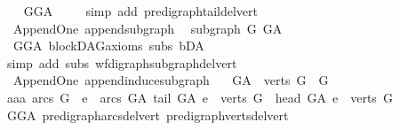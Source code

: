\begin{isabellebody}
%
\isadelimproof
\ \ %
\endisadelimproof
%
\isatagproof
{}\isamarkupfalse%
\ GG{\isacharunderscore}{\kern0pt}A\ \isanewline
\ \ \isamarkupfalse%
\ {\isacharparenleft}{\kern0pt}simp\ add{\isacharcolon}{\kern0pt}\ pre{\isacharunderscore}{\kern0pt}digraph{\isachardot}{\kern0pt}tail{\isacharunderscore}{\kern0pt}del{\isacharunderscore}{\kern0pt}vert{\isacharparenright}{\kern0pt}%
\endisatagproof
{\isafoldproof}%
%
\isadelimproof
\ \isanewline
%
\endisadelimproof
\isanewline
{}\isamarkupfalse%
\ {\isacharparenleft}{\kern0pt}\ Append{\isacharunderscore}{\kern0pt}One{\isacharparenright}{\kern0pt}\ append{\isacharunderscore}{\kern0pt}subgraph{\isacharcolon}{\kern0pt}\ \isanewline
\ {\isachardoublequoteopen}subgraph\ G\ G{\isacharunderscore}{\kern0pt}A\ {\isachardoublequoteclose}\ \isanewline
%
\isadelimproof
\ \ %
\endisadelimproof
%
\isatagproof
{}\isamarkupfalse%
\ \ GG{\isacharunderscore}{\kern0pt}A\ blockDAG{\isacharunderscore}{\kern0pt}axioms\ subs\ bD{\isacharunderscore}{\kern0pt}A\isanewline
\ \ \isamarkupfalse%
\ {\isacharparenleft}{\kern0pt}simp\ add{\isacharcolon}{\kern0pt}\ subs\ wf{\isacharunderscore}{\kern0pt}digraph{\isachardot}{\kern0pt}subgraph{\isacharunderscore}{\kern0pt}del{\isacharunderscore}{\kern0pt}vert{\isacharparenright}{\kern0pt}%
\endisatagproof
{\isafoldproof}%
%
\isadelimproof
\ \isanewline
%
\endisadelimproof
\isanewline
\isanewline
{}\isamarkupfalse%
\ {\isacharparenleft}{\kern0pt}\ Append{\isacharunderscore}{\kern0pt}One{\isacharparenright}{\kern0pt}\ append{\isacharunderscore}{\kern0pt}induce{\isacharunderscore}{\kern0pt}subgraph{\isacharcolon}{\kern0pt}\ \isanewline
\ \ {\isachardoublequoteopen}G{\isacharunderscore}{\kern0pt}A\ {\isasymrestriction}\ {\isacharparenleft}{\kern0pt}verts\ G{\isacharparenright}{\kern0pt}\ {\isacharequal}{\kern0pt}\ G{\isachardoublequoteclose}\ \ \isanewline
%
\isadelimproof
%
\endisadelimproof
%
\isatagproof
{}\isamarkupfalse%
\ {\isacharminus}{\kern0pt}\isanewline
\ \ \isamarkupfalse%
\ aaa{\isacharcolon}{\kern0pt}\ {\isachardoublequoteopen}arcs\ G\ {\isacharequal}{\kern0pt}\ {\isacharbraceleft}{\kern0pt}e\ {\isasymin}\ arcs\ G{\isacharunderscore}{\kern0pt}A{\isachardot}{\kern0pt}\ tail\ G{\isacharunderscore}{\kern0pt}A\ e\ {\isasymin}\ verts\ G\ {\isasymand}\ head\ G{\isacharunderscore}{\kern0pt}A\ e\ {\isasymin}\ verts\ G{\isacharbraceright}{\kern0pt}{\isachardoublequoteclose}\isanewline
\ \ \ \ \isamarkupfalse%
\ GG{\isacharunderscore}{\kern0pt}A\ pre{\isacharunderscore}{\kern0pt}digraph{\isachardot}{\kern0pt}arcs{\isacharunderscore}{\kern0pt}del{\isacharunderscore}{\kern0pt}vert\ pre{\isacharunderscore}{\kern0pt}digraph{\isachardot}{\kern0pt}verts{\isacharunderscore}{\kern0pt}del{\isacharunderscore}{\kern0pt}vert\isanewline

\end{isabellebody}
